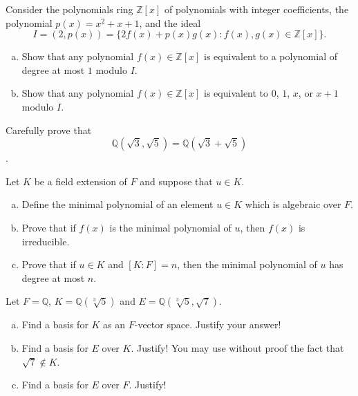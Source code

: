 \documentclass[11pt]{exam}
\theoremstyle{definition}
\begin{document}
\begin{questions}
\newpage
\question[10]\mbox{}

Consider the polynomials ring $\mathbb Z[x]$ of polynomials with integer coefficients, the polynomial $p(x) = x^2+x+1$, and the ideal
$$I = (2,p(x)) = \{ 2f(x) + p(x)g(x): f(x),g(x)\in \mathbb Z[x]\}.$$
\begin{enumerate}[(a)]
\item  
Show that any polynomial $f(x)\in \mathbb Z[x]$ is equivalent to a polynomial of degree at most $1$ modulo $I$.
\vspace{4in}
\item 
Show that any polynomial $f(x)\in \mathbb Z[x]$ is equivalent to  $0$, $1$, $x$, or $x+1$ modulo $I$.
\end{enumerate}

\newpage
\question[10]\mbox{}

Carefully prove that $$\mathbb Q(\sqrt{3},\sqrt{5}) = \mathbb Q(\sqrt{3}+\sqrt{5})$$.

\newpage
\question[10]\mbox{}
Let $K$ be a field extension of $F$ and suppose that $u\in K$.
\begin{enumerate}[(a)]
\item  Define the minimal polynomial of an element $u\in K$ which is algebraic over $F$.
\vspace{2in}
\item  Prove that if $f(x)$ is the minimal polynomial of $u$, then $f(x)$ is irreducible.
\vspace{3in}
\item  Prove that if $u\in K$ and $[K:F]=n$, then the minimal polynomial of $u$ has degree at most $n$.
\end{enumerate}

\newpage
\question[10]\mbox{}
Let $F = \mathbb Q$, $K = \mathbb Q(\sqrt[3]{5})$ and $E = \mathbb Q(\sqrt[3]{5},\sqrt{7})$.
\begin{enumerate}[(a)]
\item  Find a basis for $K$ as an $F$-vector space.  Justify your answer!
\vspace{2in}
\item  Find a basis for $E$ over $K$.  Justify!  You may use without proof the fact that $\sqrt{7}\notin K$.
\vspace{3in}
\item  Find a basis for $E$ over $F$.  Justify!
\end{enumerate}


\end{questions}
\end{document}
